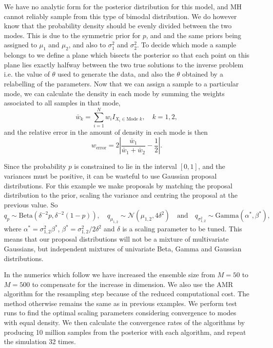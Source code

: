 \documentclass[final]{siamltex}
\begin{document}
We have no analytic form for the posterior distribution for this
model, and MH cannot reliably sample from this type of bimodal
distribution. We do however know that the probability density should
be evenly divided between the two modes. This is due to the symmetric
prior for $p$, and and the same priors being assigned to $\mu_1$ and
$\mu_2$, and also to $\sigma^2_1$ and $\sigma^2_2$. To decide which
mode a sample belongs to we define a plane which bisects the posterior
so that each point on this plane lies exactly halfway between the two
true solutions to the inverse problem i.e. the value of $\theta$ used
to generate the data, and also the $\theta$ obtained by a relabelling
of the parameters. Now that we can assign a sample to a particular
mode, we can calculate the density in each mode by summing the weights
associated to all samples in that mode,
\[
	\bar{w}_k = \sum\limits_{i=1}^N w_iI_{X_i \in \text{Mode $k$}}, \quad k = 1, 2,
\]
and the relative error in the amount of density in each mode is then
\begin{equation}\label{eqn:mode_prop}
	w_\text{error} = 2\left|\frac{\bar{w}_1}{\bar{w}_1+\bar{w}_2} - \frac{1}{2}\right|.
\end{equation}

Since the probability $p$ is constrained to lie in the interval
$[0,1]$, and the variances must be positive, it can be wasteful to use
Gaussian proposal distributions. For this example we make proposals by
matching the proposal distribution to the prior, scaling the variance
and centring the proposal at the previous value. So
\[
	q_p \sim \text{Beta}(\delta^{-2}p, \delta^{-2}(1-p)), \quad q_{\mu_{1,2}} \sim \mathcal{N}(\mu_{1,2}, 4\delta^2) \quad \text{and} \quad q_{\sigma^2_{1,2}} \sim \text{Gamma}(\alpha^*, \beta^*),
\]
where $\alpha^* = \sigma^2_{1,2}\beta^*$, $\beta^* =
\sigma^2_{1,2}/2\delta^2$ and $\delta$ is a scaling parameter to be
tuned. This means that our proposal distributions will not be a
mixture of multivariate Gaussians, but independent mixtures of
univariate Beta, Gamma and Gaussian distributions.

In the numerics which follow we have increased the ensemble size from
$M=50$ to $M=500$ to compensate for the increase in dimension. We also
use the AMR algorithm for the resampling step because of the reduced
computational cost. The method otherwise remains the same as in
previous examples. We perform test runs to find the optimal scaling
parameters considering convergence to modes with equal density. We
then calculate the convergence rates of the algorithms by producing 10
million samples from the posterior with each algorithm, and repeat the
simulation 32 times.
\end{document}
